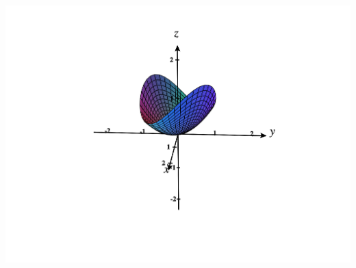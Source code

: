 \documentclass{ximera}
\begin{document}
\begin{example}
\begin{image}
\includegraphics[width=\textwidth]{CalcPlot3D-abs_extrema}
\end{image}
\end{example}
\end{document}
